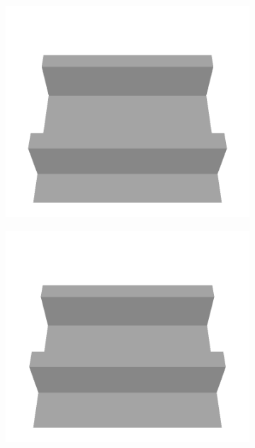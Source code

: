 \begin{figure}[H]
    \begin{subfigure}[b]{0.24\textwidth}
    \includegraphics[width=\linewidth]{../img/5/custom_patches/tunnel/all/13-3d.png}
    \end{subfigure}
    \begin{subfigure}[b]{0.24\textwidth}
    \includegraphics[width=\linewidth]{../img/5/custom_patches/tunnel/all/16-3d.png}
    \end{subfigure}
    \begin{subfigure}[b]{0.24\textwidth}

\end{subfigure}
\end{figure}
